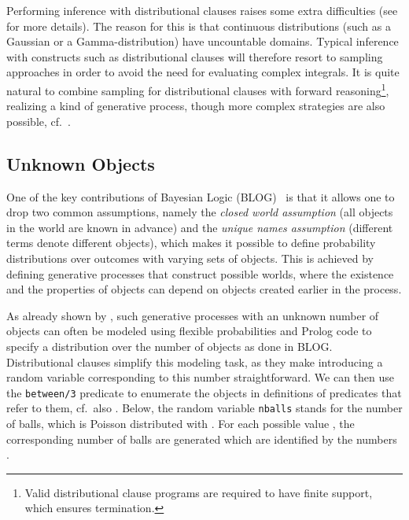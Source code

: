 \documentclass[a4paper]{article}
\begin{document}
Performing inference with distributional clauses raises some extra difficulties (see \citep{Gutmann11} for more details). The reason for this 
is that continuous distributions (such as a Gaussian or a Gamma-distribution) 
have uncountable domains. 
Typical inference with constructs such as distributional clauses
will therefore resort to sampling approaches in order to avoid the need for evaluating complex integrals.  
It is quite natural to combine sampling for distributional clauses
with forward reasoning\footnote{Valid distributional clause programs
  are required to have finite support, which ensures termination.}, realizing a kind of generative process, 
though more complex strategies are also possible,
cf.~\citep{Gutmann11}.  



\subsection{Unknown Objects}
One of the key contributions of Bayesian Logic (BLOG)~\citep{Milch05}
is that it allows one to drop two common assumptions, namely the
\emph{closed world assumption} (all objects in the world are known in
advance) and the \emph{unique names assumption} (different terms
denote different objects), which makes it possible 
to define probability distributions over outcomes with varying sets of objects. 
This is achieved by defining generative processes that construct possible worlds, where the existence and the properties of objects can depend on objects created earlier in the process.  

As already shown by \cite{Poole08}, such generative processes with an unknown
number of objects can often be modeled using flexible
probabilities and Prolog code to specify a distribution over the
number of objects as done in BLOG. 
Distributional clauses simplify this modeling task, as they make introducing a random
variable corresponding to this number straightforward. We can then use the \texttt{between/3} predicate to enumerate the objects in definitions of predicates that refer to them, cf.~also \citep{Poole08}.  
Below, the random variable \texttt{nballs} stands for the number of
balls, which is Poisson distributed with . For each
possible value , the corresponding number of balls are generated which are identified by the numbers . 
\end{document}
